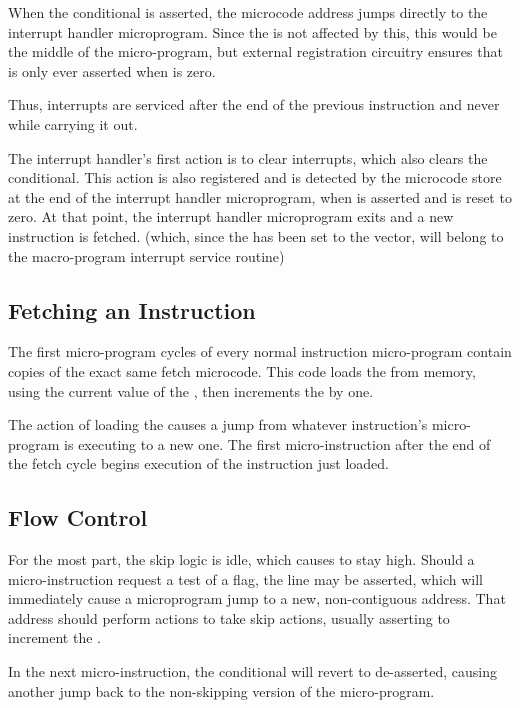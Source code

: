 When the  conditional is asserted, the microcode address jumps
directly to the interrupt handler microprogram. Since the \UPC{} is
not affected by this, this would be the middle of the micro-program,
but external registration circuitry ensures that  is only ever
asserted when \UPC{} is zero.

Thus, interrupts are serviced after the end of the previous
instruction and never while carrying it out.

The interrupt handler's first action is to clear interrupts, which
also clears the  conditional. This action is also registered
and is detected by the microcode store at the end of the interrupt
handler microprogram, when  is asserted and \UPC{} is reset to
zero. At that point, the interrupt handler microprogram exits and a
new instruction is fetched. (which, since the \PC{} has been set to the
 vector, will belong to the macro-program interrupt service
routine)

\subsection{Fetching an Instruction}

The first micro-program cycles of every normal instruction
micro-program contain copies of the exact same fetch microcode. This
code loads the \IR{} from memory, using the current value of the
\PC{}, then increments the \PC{} by one.

The action of loading the \IR{} causes a jump from whatever
instruction's micro-program is executing to a new one. The first
micro-instruction after the end of the fetch cycle begins execution of
the instruction just loaded.

\subsection{Flow Control}

For the most part, the skip logic is idle, which causes  to
stay high. Should a micro-instruction request a test of a flag, the
 line may be asserted, which will immediately cause a
microprogram jump to a new, non-contiguous address. That address
should perform actions to take skip actions, usually asserting
 to increment the \PC{}.

In the next micro-instruction, the  conditional will revert
to de-asserted, causing another jump back to the non-skipping version
of the micro-program.

